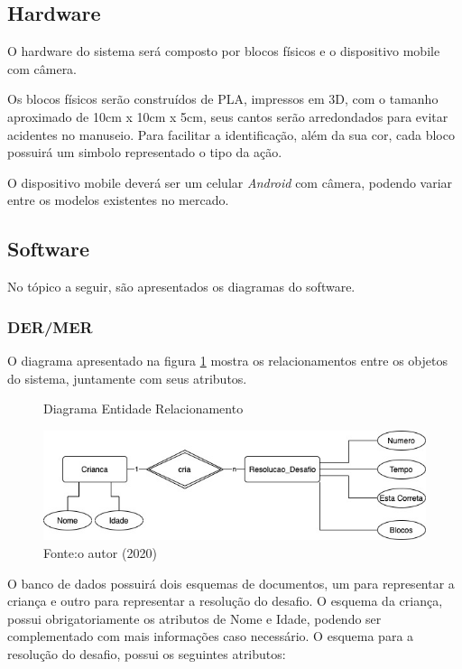     \subsection{Hardware}
    O hardware do sistema será composto por blocos físicos e o dispositivo mobile com câmera.
    
    Os blocos físicos serão construídos de PLA, impressos em 3D, com o tamanho aproximado de 10cm x 10cm x 5cm, seus cantos serão arredondados para evitar acidentes no manuseio. Para facilitar a identificação, além da sua cor, cada bloco possuirá um simbolo representado o tipo da ação.
    
    O dispositivo mobile deverá ser um celular \textit{Android} com câmera, podendo variar entre os modelos existentes no mercado.
    
    \subsection{Software}
     No tópico a seguir, são apresentados os diagramas do software.
        
        \subsubsection{DER/MER}
        O diagrama apresentado na figura \ref{figura:der_mer} mostra os relacionamentos entre os objetos do sistema, juntamente com seus atributos.
        
        \begin{figure}[h!]
            \centering
            \caption{Diagrama Entidade Relacionamento}
            \includegraphics[width=12cm]{images/cap3/MER_DER.jpg}
            \caption*{Fonte:o autor (2020)}
            \label{figura:der_mer}
        \end{figure}
        
        O banco de dados possuirá dois esquemas de documentos, um para representar a criança e outro para representar a resolução do desafio.
        O esquema da criança, possui obrigatoriamente os atributos de Nome e Idade, podendo ser complementado com mais informações caso necessário.
        O esquema para a resolução do desafio, possui os seguintes atributos:
        
